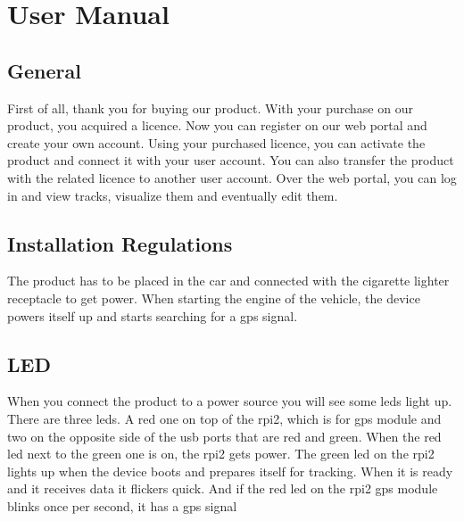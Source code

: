 \chapter{User Manual}
\section{General}
First of all, thank you for buying our product. With your purchase on our product, you acquired a licence. Now you can register on our web portal and create your own account. Using your purchased licence, you can activate the product and connect it with your user account. You can also transfer the product with the related licence to another user account. Over the web portal, you can log in and view tracks, visualize them and eventually edit them.
\section{Installation Regulations}
The product has to be placed in the car and connected with the cigarette lighter receptacle to get power. When starting the engine of the vehicle, the device powers itself up and starts searching for a \gls{gps} signal.
\section{LED}
When you connect the product to a power source you will see some \gls{led}s light up.
There are three \gls{led}s. A red one on top of the \gls{rpi2}, which is for \gls{gps} module and two on the opposite side of the \gls{usb} ports that are red and green.
When the red \gls{led} next to the green one is on, the \gls{rpi2} gets power.
The green \gls{led} on the \gls{rpi2} lights up when the device boots and prepares itself for tracking. When it is ready and it receives data it flickers quick.
And if the red \gls{led} on the \gls{rpi2} \gls{gps} module blinks once per second, it has a \gls{gps} signal
